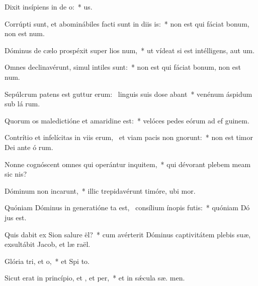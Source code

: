 \item Dixit insípiens in de o:~*   us.
\item Corrúpti sunt, et abominábiles facti sunt in diis is:~* non est qui fáciat bonum, non est   num.
\item Dóminus de cælo prospéxit super lios num,~* ut vídeat si est intélligens, aut  um.
\item Omnes declinavérunt, simul intiles  sunt:~* non est qui fáciat bonum, non est   num.
\item Sepúlcrum patens est guttur erum:~\pscross{} linguis suis dose abant~* venénum áspidum sub lá rum.
\item Quorum os maledictióne et amaridine  est:~* velóces pedes eórum ad ef guinem.
\item Contrítio et infelícitas in viis erum,~\pscross{} et viam pacis non gnorunt:~* non est timor Dei ante ó rum.
\item Nonne cognóscent omnes qui operántur inquitem,~* qui dévorant plebem meam sic  nis?
\item Dóminum non incarunt,~* illic trepidavérunt timóre, ubi   mor.
\item Quóniam Dóminus in generatióne ta est,~\pscross{} consílium ínopis futis:~* quóniam Dó  jus est.
\item Quis dabit ex Sion salure ël?~* cum avérterit Dóminus captivitátem plebis suæ, exsultábit Jacob, et læ raël.
\item Glória tri, et o,~* et Spi to.
\item Sicut erat in princípio, et , et per,~* et in sǽcula sæ. men.
